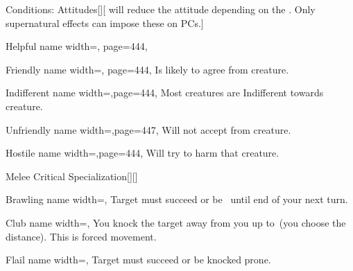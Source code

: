 \begin{PageFrontLandscape}
\begin{TablesHalf}{\frontTableHeight}
\begin{Table}{Conditions: Attitudes}[][ will reduce the attitude depending on the \GM.
        \quad Only supernatural effects can impose these on PCs.]
\begin{entry}{Helpful}{%
                name width=\conditionLength,%
                page=444,
            }
            \end{entry}
            \begin{entry}{Friendly}{%
                name width=\conditionLength,%
                page=444,
            }
                Is likely to agree  from creature. \hfill
            \end{entry}
            \begin{entry}{Indifferent}{%
                name width=\conditionLength,page=444,}
                Most creatures are Indifferent towards creature.
            \end{entry}
            \begin{entry}{Unfriendly}{%
                name width=\conditionLength,page=447,}
                Will not accept  from creature.
            \end{entry}
            \begin{entry}{Hostile}{%
                name width=\conditionLength,page=444,}
                Will try to harm that creature.
            \end{entry}
        \end{Table}
        \TableSpace
        \begin{Table}{Melee Critical Specialization}[][]
            \begin{entry}{Brawling}{%
                name width=\conditionLength,%
            }
                Target must succeed \Fortitude[][before=Class] or be \Slowed\, until end of your next turn.
            \end{entry}
            \begin{entry}{Club}{%
                name width=\conditionLength,%
            }
                You knock the target away from you up to  \Feet\,(you choose the distance).
                This is forced movement.
            \end{entry}
            \begin{entry}{Flail}{%
                name width=\conditionLength,%
            }
                Target must succeed \Reflex[][before=Class] or be knocked prone.

\end{entry}
\end{Table}
\end{TablesHalf}
\end{PageFrontLandscape}
